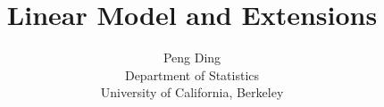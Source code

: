 \documentclass[krantz2]{krantz}
\begin{document}
\frontmatter

\title{Linear Model and Extensions}
\author{Peng Ding\\
Department of Statistics\\
University of California, Berkeley}




\maketitle





\tableofcontents 


  
  
  


\mainmatter





\makeatletter
{}
\makeatother

\renewcommand {\theexample} {\thechapter.\arabic{example}}
\renewcommand {\theassumption} {\thechapter.\arabic{assumption}}
\renewcommand {\thelemma} {\thechapter.\arabic{lemma}}
\renewcommand {\thetheorem} {\thechapter.\arabic{theorem}}
\renewcommand {\theremark} {\thechapter.\arabic{remark}}
\renewcommand {\theproposition} {\thechapter.\arabic{proposition}}
\renewcommand {\thecorollary} {\thechapter.\arabic{corollary}}
 \renewcommand {\thecondition} {\thechapter.\arabic{condition}}
 \renewcommand {\thedefinition} {\thechapter.\arabic{definition}}
\renewcommand{\theparagraph}{\arabic{chapter}.\arabic{paragraph}}

 



\end{document}
